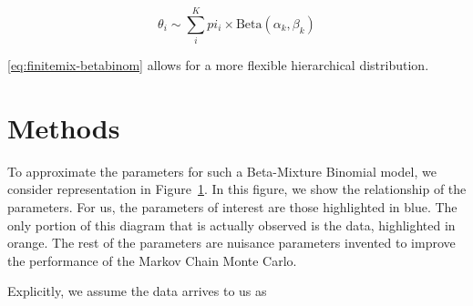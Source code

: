 \documentclass{article}
\begin{document}
\begin{equation}\label{eq:finitemix-betabinom}
\theta_i \sim \sum_i^K pi_i \times \text{Beta}(\alpha_k, \beta_k)
\end{equation}

\eqref{eq:finitemix-betabinom} allows for a more flexible hierarchical distribution. 
\newpage

\section{Methods}

To approximate the parameters for such a Beta-Mixture Binomial model, we consider representation in Figure~\ref{fig:diagram}. In this figure, we show the relationship of the parameters. For us, the parameters of interest are those highlighted in {\color{blue}blue}. The only portion of this diagram that is actually observed is the data, highlighted in {\color{orange}orange}. The rest of the parameters are nuisance parameters invented to improve the performance of the Markov Chain Monte Carlo. \\

\begin{figure}[H]
\centering
{}
\label{fig:diagram}
\end{figure}

Explicitly, we assume the data arrives to us as
\end{document}
